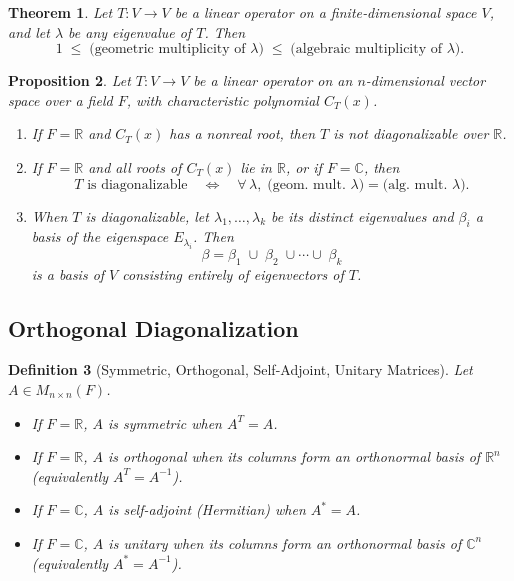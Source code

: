 \documentclass[12pt]{article}
\theoremstyle{break}             %
\newtheorem{thm}{Theorem}          %
\newtheorem{prop}[thm]{Proposition}%
\newtheorem{defn}[thm]{Definition}
\begin{document}
\begin{thm}
Let \(T:V\to V\) be a linear operator on a finite‐dimensional space \(V\), and let \(\lambda\) be any eigenvalue of \(T\).  Then
\[
1 \;\le\;\bigl(\text{geometric multiplicity of }\lambda\bigr)
\;\le\;\bigl(\text{algebraic multiplicity of }\lambda\bigr).
\]
\end{thm}

\begin{prop}
Let \(T:V\to V\) be a linear operator on an \(n\)-dimensional vector space over a field \(F\), with characteristic polynomial \(C_T(x)\).
\begin{enumerate}
  \item If \(F=\mathbb{R}\) and \(C_T(x)\) has a nonreal root, then \(T\) is not diagonalizable over \(\mathbb{R}\).
  \item If \(F=\mathbb{R}\) and all roots of \(C_T(x)\) lie in \(\mathbb{R}\), or if \(F=\mathbb{C}\), then
  \[
  T \text{ is diagonalizable}
  \quad\Longleftrightarrow\quad
  \forall\,\lambda,\;
    \bigl(\text{geom.~mult.~}\lambda\bigr)
    =\bigl(\text{alg.~mult.~}\lambda\bigr).
  \]
  \item When \(T\) is diagonalizable, let \(\lambda_1,\dots,\lambda_k\) be its distinct eigenvalues and \(\beta_i\) a basis of the eigenspace \(E_{\lambda_i}\).  Then
  \[
    \beta = \beta_1\;\cup\;\beta_2\;\cup\cdots\cup\;\beta_k
  \]
  is a basis of \(V\) consisting entirely of eigenvectors of \(T\).
\end{enumerate}
\end{prop}

\subsection{Orthogonal Diagonalization}

\begin{defn}[Symmetric, Orthogonal, Self-Adjoint, Unitary Matrices]
Let \(A\in M_{n\times n}(F)\).
\begin{itemize}
  \item If \(F=\mathbb R\), \(A\) is \emph{symmetric} when \(A^T=A\).
  \item If \(F=\mathbb R\), \(A\) is \emph{orthogonal} when its columns form an orthonormal basis of \(\mathbb R^n\) (equivalently \(A^T=A^{-1}\)).
  \item If \(F=\mathbb C\), \(A\) is \emph{self-adjoint} (Hermitian) when \(A^*=A\).
  \item If \(F=\mathbb C\), \(A\) is \emph{unitary} when its columns form an orthonormal basis of \(\mathbb C^n\) (equivalently \(A^*=A^{-1}\)).
\end{itemize}
\end{defn}
\end{document}
